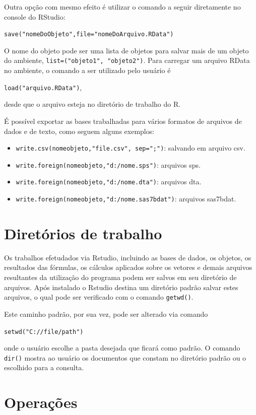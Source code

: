 \documentclass[12pt,brazil,]{book}
\providecommand{\tightlist}{%
  \setlength{\itemsep}{0pt}\setlength{\parskip}{0pt}}
\begin{document}
Outra opção com mesmo efeito é utilizar o comando a seguir diretamente
no console do RStudio:

\texttt{save("nomeDoObjeto",file="nomeDoArquivo.RData")}

O nome do objeto pode ser uma lista de objetos para salvar mais de um
objeto do ambiente, \texttt{list=("objeto1",\ "objeto2")}. Para carregar
um arquivo RData no ambiente, o comando a ser utilizado pelo usuário é

\texttt{load("arquivo.RData")},

desde que o arquivo esteja no diretório de trabalho do R.

É possível exportar as bases trabalhadas para vários formatos de
arquivos de dados e de texto, como seguem alguns exemplos:

\begin{itemize}
\tightlist
\item
  \texttt{write.csv(nomeobjeto,"file.csv",\ sep=";")}: salvando em
  arquivo csv.
\item
  \texttt{write.foreign(nomeobjeto,"d:/nome.sps")}: arquivos sps.
\item
  \texttt{write.foreign(nomeobjeto,"d:/nome.dta")}: arquivos dta.
\item
  \texttt{write.foreign(nomeobjeto,"d:/nome.sas7bdat")}: arquivos
  sas7bdat.
\end{itemize}

\hypertarget{diretorios-de-trabalho}{%
\section{Diretórios de trabalho}\label{diretorios-de-trabalho}}

Os trabalhos efetudados via Rstudio, incluindo as bases de dados, os
objetos, os resultados das fórmulas, os cálculos aplicados sobre os
vetores e demais arquivos resultantes da utilização do programa podem
ser salvos em seu diretório de arquivos. Após instalado o Rstudio
destina um diretório padrão salvar estes arquivos, o qual pode ser
verificado com o comando \texttt{getwd()}.

Este caminho padrão, por sua vez, pode ser alterado via comando

\texttt{setwd("C://file/path")}

onde o usuário escolhe a pasta desejada que ficará como padrão. O
comando \texttt{dir()} mostra ao usuário os documentos que constam no
diretório padrão ou o escolhido para a consulta.

\hypertarget{operacoes}{%
\section{Operações}\label{operacoes}}
\end{document}
